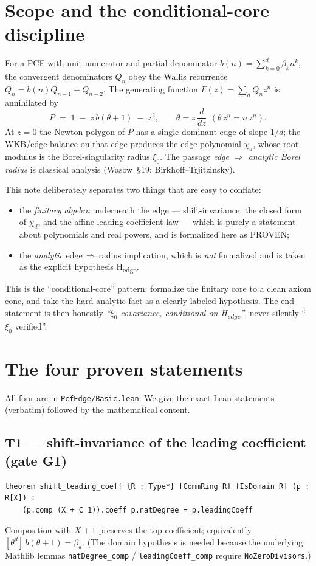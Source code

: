 \documentclass[11pt]{article}
\newcommand{\xizero}{\xi_{0}}
\newcommand{\Hedge}{\textsf{H\textsubscript{edge}}}
\begin{document}
\section{Scope and the conditional-core discipline}

For a PCF with unit numerator and partial denominator
$b(n)=\sum_{k=0}^{d}\beta_k n^{k}$, the convergent denominators $Q_n$ obey the
Wallis recurrence $Q_n=b(n)Q_{n-1}+Q_{n-2}$. The generating function
$F(z)=\sum_n Q_n z^{n}$ is annihilated by
\begin{equation}\label{eq:operator}
  P \;=\; 1 \;-\; z\,b(\theta+1)\;-\;z^{2},
  \qquad \theta=z\,\frac{d}{dz}\ \ (\theta\,z^{n}=n\,z^{n}).
\end{equation}
At $z=0$ the Newton polygon of $P$ has a single dominant edge of slope $1/d$;
the WKB/edge balance on that edge produces the edge polynomial $\chi_d$, whose
root modulus is the Borel-singularity radius $\xizero$. The passage
\emph{edge $\Rightarrow$ analytic Borel radius} is classical analysis
(Wasow~\S19; Birkhoff--Trjitzinsky). 

This note deliberately separates two things that are easy to conflate:
\begin{itemize}\setlength\itemsep{2pt}
  \item the \emph{finitary algebra} underneath the edge --- shift-invariance,
        the closed form of $\chi_d$, and the affine leading-coefficient law ---
        which is purely a statement about polynomials and real powers, and is
        formalized here as PROVEN;
  \item the \emph{analytic} edge\,$\Rightarrow$\,radius implication, which is
        \emph{not} formalized and is taken as the explicit hypothesis \Hedge.
\end{itemize}
This is the ``conditional-core'' pattern: formalize the finitary core to a clean
axiom cone, and take the hard analytic fact as a clearly-labeled hypothesis.
The end statement is then honestly \emph{``$\xizero$ covariance, conditional on
\Hedge''}, never silently ``$\xizero$ verified''.

\section{The four proven statements}

All four are in \texttt{PcfEdge/Basic.lean}. We give the exact Lean statements
(verbatim) followed by the mathematical content.

\subsection*{T1 --- shift-invariance of the leading coefficient (gate G1)}
\begin{lstlisting}
theorem shift_leading_coeff {R : Type*} [CommRing R] [IsDomain R] (p : R[X]) :
    (p.comp (X + C 1)).coeff p.natDegree = p.leadingCoeff
\end{lstlisting}
Composition with $X+1$ preserves the top coefficient; equivalently
$[\theta^{d}]\,b(\theta+1)=\beta_d$. (The domain hypothesis is needed because
the underlying Mathlib lemmas \texttt{natDegree\_comp} / \texttt{leadingCoeff\_comp}
require \texttt{NoZeroDivisors}.)
\end{document}
